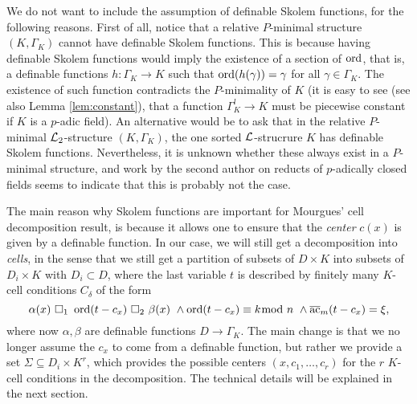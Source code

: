 We do not want to include the assumption of definable Skolem functions, for the following reasons. First of all, notice that a relative $P$-minimal structure $(K,\Gamma_K)$ cannot have definable Skolem functions. This is because having definable Skolem functions would imply the existence of a section of $\operatorname{ord}$, that is, a definable functions $h:\Gamma_K\to K$ such that $\operatorname{ord}(h(\gamma))=\gamma$ for all $\gamma\in \Gamma_K$. The existence of such function contradicts the $P$-minimality of $K$ (it is easy to see (see also Lemma \ref{lem:constant}), that a function $\Gamma_K^l \to K$ must be piecewise constant if $K$ is a $p$-adic field). An alternative would be to ask that in the relative $P$-minimal $\mathcal{L}_2$-structure $(K,\Gamma_K)$, the one sorted $\mathcal{L}$-strucrure $K$ has definable Skolem functions. Nevertheless, it is unknown whether these always exist in a $P$-minimal structure, and work by the second author on reducts of $p$-adically closed fields \cite{lee-2012.1} seems to indicate that this is probably not the case. 

The main reason why Skolem functions are important for Mourgues' cell decomposition result, is because it allows one to ensure that the \emph{center} $c(x)$ is given by a definable function. In our case, we will still get a decomposition into \emph{cells}, in the sense that we still get a partition of subsets of $D\times K$ into subsets of $D_i \times K$ with $D_i \subset D$, where the last variable $t$ is described by finitely many $K$-cell conditions $C_{\delta}$ of the form
 \begin{equation*}
 \alpha(x)\ \square_1 \ \ord(t-c_x) \ \square_2 \ \beta(x) \ \wedge \ord(t-c_x) \equiv k\hspace{-6pt}\mod n \ \wedge \ac_{m}(t-c_x) = \xi ,
\end{equation*}
where now $\alpha,\beta$ are definable functions $D\to \Gamma_K$. The main change is that we no longer assume the $c_x$ to come from a definable function, but rather we provide a set $\Sigma \subseteq D_i \times K^r$, which provides the possible centers $(x,c_1,\ldots, c_r)$ for the $r$ $K$-cell conditions in the decomposition. The technical details will be explained in the next section.

